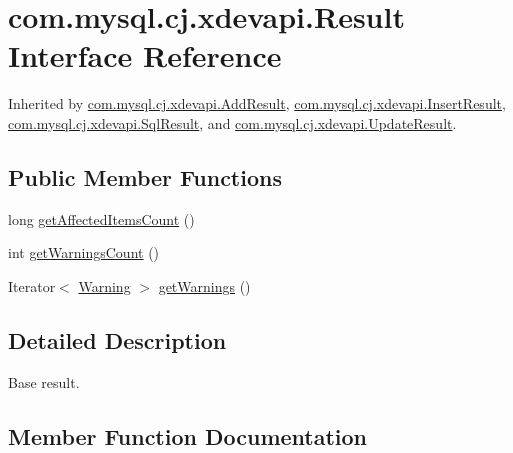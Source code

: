 \hypertarget{interfacecom_1_1mysql_1_1cj_1_1xdevapi_1_1_result}{}\section{com.\+mysql.\+cj.\+xdevapi.\+Result Interface Reference}
\label{interfacecom_1_1mysql_1_1cj_1_1xdevapi_1_1_result}


Inherited by \mbox{\hyperlink{interfacecom_1_1mysql_1_1cj_1_1xdevapi_1_1_add_result}{com.\+mysql.\+cj.\+xdevapi.\+Add\+Result}}, \mbox{\hyperlink{interfacecom_1_1mysql_1_1cj_1_1xdevapi_1_1_insert_result}{com.\+mysql.\+cj.\+xdevapi.\+Insert\+Result}}, \mbox{\hyperlink{interfacecom_1_1mysql_1_1cj_1_1xdevapi_1_1_sql_result}{com.\+mysql.\+cj.\+xdevapi.\+Sql\+Result}}, and \mbox{\hyperlink{classcom_1_1mysql_1_1cj_1_1xdevapi_1_1_update_result}{com.\+mysql.\+cj.\+xdevapi.\+Update\+Result}}.

\subsection*{Public Member Functions}
\begin{DoxyCompactItemize}
\item 
long \mbox{\hyperlink{interfacecom_1_1mysql_1_1cj_1_1xdevapi_1_1_result_a6389cfd50f26c8efc0120b5f3072d228}{get\+Affected\+Items\+Count}} ()
\item 
int \mbox{\hyperlink{interfacecom_1_1mysql_1_1cj_1_1xdevapi_1_1_result_addd5c82af4ab35e702d7f2961119ecc6}{get\+Warnings\+Count}} ()
\item 
Iterator$<$ \mbox{\hyperlink{interfacecom_1_1mysql_1_1cj_1_1protocol_1_1_warning}{Warning}} $>$ \mbox{\hyperlink{interfacecom_1_1mysql_1_1cj_1_1xdevapi_1_1_result_a7bd12aba36fc02a31c8fd546fe731e98}{get\+Warnings}} ()
\end{DoxyCompactItemize}


\subsection{Detailed Description}
Base result. 

\subsection{Member Function Documentation}
\mbox{\label{interfacecom_1_1mysql_1_1cj_1_1xdevapi_1_1_result_a6389cfd50f26c8efc0120b5f3072d228}} 
